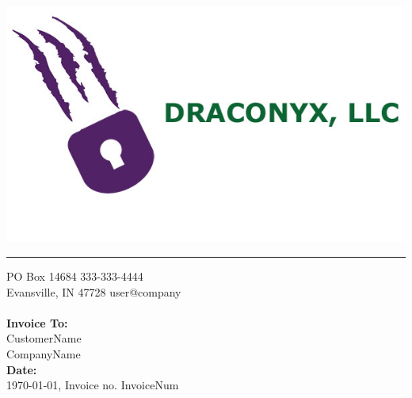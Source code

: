 \documentclass{invoice} %
\def \tab {\hspace*{3ex}} %
\begin{document}

\hfil{\includegraphics[scale=0.2]{draconyx-splash.jpg}}\hfil
\hrule %

PO Box 14684 \hfill 333-333-4444 \\ %
Evansville, IN 47728  \hfill user@company
\\ \\
{\bf Invoice To:} \\
\tab CustomerName\\ %
\tab CompanyName \\ %
{\bf Date:} \\
\tab \today , Invoice no. InvoiceNum %


\begin{invoiceTable}



\end{invoiceTable}

\end{document}
